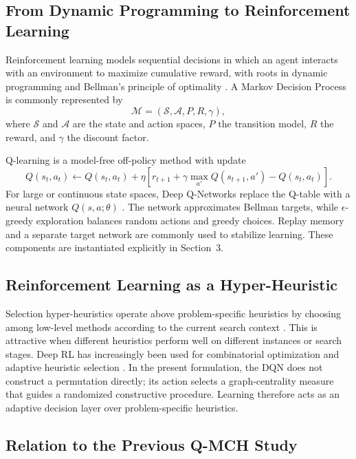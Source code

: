 \documentclass[runningheads]{llncs}
\begin{document}
\subsection{From Dynamic Programming to Reinforcement Learning}

Reinforcement learning models sequential decisions in which an agent interacts with an environment to maximize cumulative reward, with roots in dynamic programming and Bellman's principle of optimality \cite{bellman1957}. A Markov Decision Process is commonly represented by
\[
\mathcal{M}=(\mathcal{S},\mathcal{A},P,R,\gamma),
\]
where $\mathcal{S}$ and $\mathcal{A}$ are the state and action spaces, $P$ the transition model, $R$ the reward, and $\gamma$ the discount factor.

Q-learning \cite{watkins1992} is a model-free off-policy method with update
\[
Q(s_t,a_t)\leftarrow Q(s_t,a_t)+
\eta\left[
r_{t+1}+\gamma\max_{a'}Q(s_{t+1},a')-Q(s_t,a_t)
\right].
\]
For large or continuous state spaces, Deep Q-Networks replace the Q-table with a neural network $Q(s,a;\theta)$ \cite{mnih2015}. The network approximates Bellman targets, while $\epsilon$-greedy exploration balances random actions and greedy choices. Replay memory and a separate target network are commonly used to stabilize learning. These components are instantiated explicitly in Section~3.

\subsection{Reinforcement Learning as a Hyper-Heuristic}

Selection hyper-heuristics operate above problem-specific heuristics by choosing among low-level methods according to the current search context \cite{burke2013}. This is attractive when different heuristics perform well on different instances or search stages. Deep RL has increasingly been used for combinatorial optimization and adaptive heuristic selection \cite{mazyavkina2021,zhang2022,kallestad2023}. In the present formulation, the DQN does not construct a permutation directly; its action selects a graph-centrality measure that guides a randomized constructive procedure. Learning therefore acts as an adaptive decision layer over problem-specific heuristics.

\subsection{Relation to the Previous Q-MCH Study}
\end{document}

